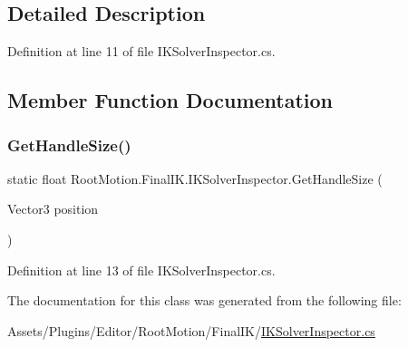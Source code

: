 \subsection{Detailed Description}


Definition at line 11 of file I\+K\+Solver\+Inspector.\+cs.



\subsection{Member Function Documentation}
\mbox{\label{class_root_motion_1_1_final_i_k_1_1_i_k_solver_inspector_aa8356b302f158d55e794d48a0da54a61}} 
\subsubsection{\texorpdfstring{Get\+Handle\+Size()}{GetHandleSize()}}
{\footnotesize\ttfamily static float Root\+Motion.\+Final\+I\+K.\+I\+K\+Solver\+Inspector.\+Get\+Handle\+Size (\begin{DoxyParamCaption}\item[{Vector3}]{position }\end{DoxyParamCaption})\hspace{0.3cm}{\ttfamily [static]}}



Definition at line 13 of file I\+K\+Solver\+Inspector.\+cs.



The documentation for this class was generated from the following file\+:\begin{DoxyCompactItemize}
\item 
Assets/\+Plugins/\+Editor/\+Root\+Motion/\+Final\+I\+K/\mbox{\hyperlink{_i_k_solver_inspector_8cs}{I\+K\+Solver\+Inspector.\+cs}}\end{DoxyCompactItemize}
